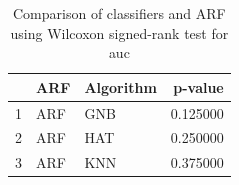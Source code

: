 \begin{table}
\footnotesize
\caption{Comparison of classifiers and ARF using Wilcoxon signed-rank test for auc}
\label{tab:ARF wilcoxon AUC comparison}
\begin{tabular}{lllr}
\hline
 & ARF & Algorithm & p-value \\
\hline
1 & ARF & GNB & 0.125000 \\
2 & ARF & HAT & 0.250000 \\
3 & ARF & KNN & 0.375000 \\
\hline
\end{tabular}
\end{table}
